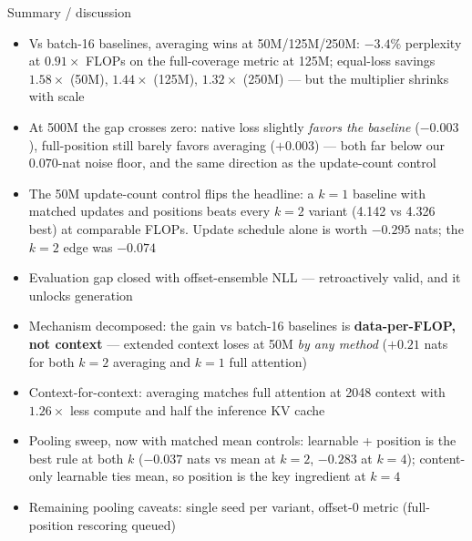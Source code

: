 \documentclass[10pt,aspectratio=169]{beamer}
\newcommand{\good}[1]{\textcolor{okgreen}{#1}}
\newcommand{\bad}[1]{\textcolor{warnred}{#1}}
\begin{document}
\begin{frame}{Summary / discussion}
  \scriptsize
  \begin{itemize}
    \item Vs batch-16 baselines, averaging wins at 50M/125M/250M: $-3.4\%$
          perplexity at $0.91\times$ FLOPs on the full-coverage metric at
          125M; equal-loss savings $1.58\times$ (50M), $1.44\times$ (125M),
          $1.32\times$ (250M) --- but the multiplier \bad{shrinks} with scale
    \item \bad{At 500M the gap crosses zero}: native loss slightly
          \emph{favors the baseline} ($-0.003$), full-position still barely
          favors averaging ($+0.003$) --- both far below our $0.070$-nat
          noise floor, and the same direction as the update-count control
    \item \bad{The 50M update-count control flips the headline}: a $k{=}1$
          baseline with matched updates and positions beats every $k{=}2$
          variant (4.142 vs 4.326 best) at comparable FLOPs. Update schedule
          alone is worth $-0.295$ nats; the $k{=}2$ edge was $-0.074$
    \item Evaluation gap closed with offset-ensemble NLL --- retroactively
          valid, and it unlocks generation
    \item Mechanism decomposed: the gain vs batch-16 baselines is
          \textbf{data-per-FLOP, not context} --- extended context loses at
          50M \emph{by any method} ($+0.21$ nats for both $k{=}2$ averaging
          and $k{=}1$ full attention)
    \item Context-for-context: averaging \good{matches full attention at 2048
          context with $1.26\times$ less compute} and half the inference KV
          cache
    \item Pooling sweep, now with matched mean controls:
          \good{learnable + position is the best rule at both $k$}
          ($-0.037$ nats vs mean at $k{=}2$, $-0.283$ at $k{=}4$);
          content-only learnable ties mean, so position is the key
          ingredient at $k{=}4$
    \item Remaining pooling caveats: single seed per variant, offset-0
          metric (full-position rescoring queued)
  \end{itemize}
\end{frame}
\end{document}
